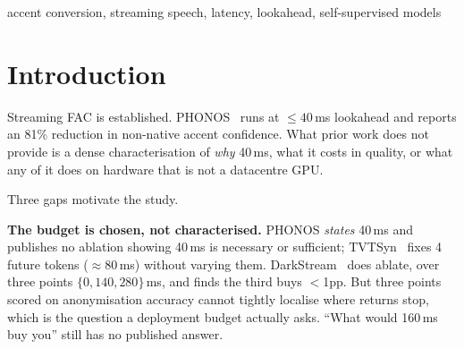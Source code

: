 \documentclass[journal]{IEEEtran}
\newcommand{\tcmp}{\ensuremath{t_{\mathrm{cmp}}}}
\begin{document}
\begin{abstract}
realized-phone transcription at matched capacity ($-0.045$ against $-0.029$
PER per doubling, $1.55\times$), and within the canonical-phone arm the benefit is
$1.32\times$ larger in absolute PER slope at canonical-deviation positions
(substitutions and deletions in the g2p--IPA alignment). Fourth, repeating the sweep on a second causalised encoder (wav2vec 2.0 base),
tapped at its own selected phonetic layer, changes the answer: it starts within
$0.011$ PER of WavLM at $L{=}0$ yet gains only $3.9\%$ relative from $640$\,ms
of lookahead against WavLM's $63.3\%$, and where WavLM is smooth and
log-linear ($R^2=0.99$) its response is weak and non-monotonic ($R^2=0.10$),
bottoming out at $160$\,ms and rising again, a pattern reproduced at a
second seed; at five times the training budget the $0/160/640$\,ms ordering is
unchanged and its endpoint gain shrinks to $+1.8\%$ against WavLM's
$+65.8\%$. Neither the measured exchange
rate nor the detailed curve shape is a universal property of the task. Fifth, per-chunk compute depends only weakly on
lookahead, moving at most $1.9\%$ on an Apple M4 and $7.6\%$ on an ARM64 Linux
host across a $17\times$ change in algorithmic latency. That is a weak
empirical dependence over the tested range,
subject to the throughput constraint $\tcmp<c$. We release the harness and the per-condition outputs.
\end{abstract}


\begin{IEEEkeywords}
accent conversion, streaming speech, latency, lookahead, self-supervised models
\end{IEEEkeywords}

\section{Introduction}

Streaming FAC is established. PHONOS~\cite{phonos2026} runs at
${\leq}40$\,ms lookahead and reports an 81\% reduction in non-native accent
confidence. What prior work does not provide is a dense characterisation of \emph{why} 40\,ms, what it
costs in quality, or what any of it does on hardware that is not a datacentre
GPU.

Three gaps motivate the study.

\textbf{The budget is chosen, not characterised.} PHONOS \emph{states} 40\,ms
and publishes no ablation showing 40\,ms is necessary or sufficient;
TVTSyn~\cite{tvtsyn2026} fixes 4 future tokens ($\approx$80\,ms) without
varying them. DarkStream~\cite{darkstream2025} does ablate, over three points
$\{0, 140, 280\}$\,ms, and finds the third buys
$<$1pp. But three points scored on anonymisation accuracy cannot tightly
localise where returns stop, which is the question a deployment budget actually asks.
``What would 160\,ms buy you'' still has no published answer.
\end{document}
